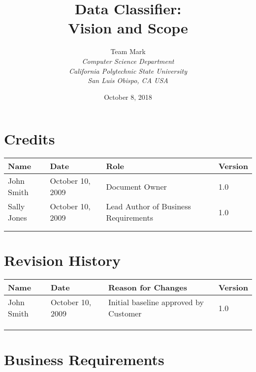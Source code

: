\documentclass[12pt,oneside,letterpaper]{article}
\begin{document}
\title{\bfseries Data Classifier: \\Vision and Scope}

\author {
\large{Team Mark}\\
\emph{Computer Science Department}\\
\emph{California Polytechnic State University}\\
\emph{San Luis Obispo, CA USA}\\
}

\date{October 8, 2018}
\maketitle \thispagestyle{empty}

\pagebreak
\tableofcontents


\section*{Credits}
\begin{tabular}{|l|l|p{2in}|l|}
\hline
\textbf{Name}&\textbf{Date}&\textbf{Role}&\textbf{Version}\\
\hline
John Smith&October 10, 2009&Document Owner&1.0\\
\hline
Sally Jones&October 10, 2009&Lead Author of Business Requirements&1.0\\
\hline
&&&\\
\hline
&&&\\
\hline
\end{tabular}


\section*{Revision History}
\begin{tabular}{|l|l|p{2in}|l|}
\hline
\textbf{Name}&\textbf{Date}&\textbf{Reason for Changes}&\textbf{Version}\\
\hline
John Smith&October 10, 2009&Initial baseline approved by Customer&1.0\\
\hline
&&&\\
\hline
&&&\\
\hline
&&&\\
\hline
\end{tabular}


\newpage

\section{Business Requirements}
\end{document}
